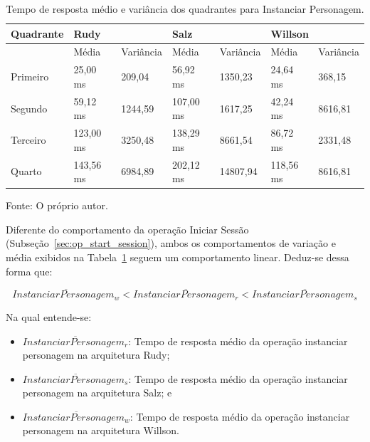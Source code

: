 \pagebreak

\begin{table}[htb!]
\centering
\begin{adjustbox}{max width=\textwidth}
\caption{Tempo de resposta médio e variância dos quadrantes para Instanciar Personagem.}
\label{tab:op_spawn_character}
\begin{tabular}{l||l|l||l|l||l|l}

\hline \hline

Quadrante & \multicolumn{2}{l||}{Rudy}    & \multicolumn{2}{l||}{Salz}    & \multicolumn{2}{l}{Willson} \\ \hline \hline

& Média & Variância & Média & Variância & Média & Variância \\ \hline

Primeiro  & 25,00 ms & 209,04 & 56,92 ms & 1350,23 & 24,64 ms & 368,15 \\ \hline

Segundo  & 59,12 ms & 1244,59 & 107,00 ms & 1617,25 & 42,24 ms & 8616,81 \\ \hline

Terceiro  & 123,00 ms & 3250,48 & 138,29 ms & 8661,54 & 86,72 ms & 2331,48 \\ \hline

Quarto  & 143,56 ms & 6984,89 & 202,12 ms & 14807,94 & 118,56 ms & 8616,81 \\ \hline \hline

\end{tabular}

\end{adjustbox}

Fonte: O próprio autor.
\end{table}

Diferente do comportamento da operação Iniciar Sessão (Subseção~\ref{sec:op_start_session}), ambos os comportamentos de variação e média exibidos na Tabela~\ref{tab:op_spawn_character} seguem um comportamento linear.
%
Deduz-se dessa forma que:

$$
  \overline{InstanciarPersonagem_{w}} < \overline{InstanciarPersonagem_{r}} <\overline{InstanciarPersonagem_{s}}
$$

Na qual entende-se:

\begin{itemize}
 \item $\overline{InstanciarPersonagem_{r}}$: Tempo de resposta médio da operação instanciar personagem na arquitetura Rudy;
 \item $\overline{InstanciarPersonagem_{s}}$: Tempo de resposta médio da operação instanciar personagem na arquitetura Salz; e
 \item $\overline{InstanciarPersonagem_{w}}$: Tempo de resposta médio da operação instanciar personagem na arquitetura Willson.
\end{itemize}


